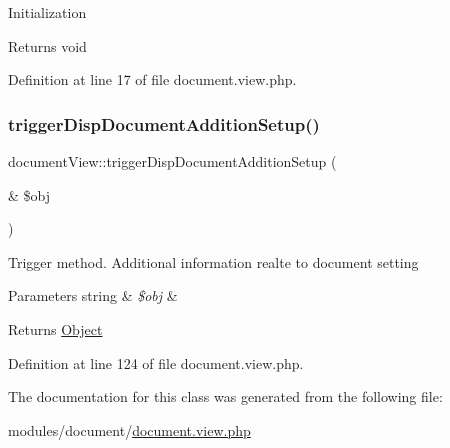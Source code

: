 Initialization \begin{DoxyReturn}{Returns}
void 
\end{DoxyReturn}


Definition at line 17 of file document.\+view.\+php.

\mbox{\label{classdocumentView_a0ea8992b5f032e29e528cbb9ab1b709c}} 
\subsubsection{\texorpdfstring{trigger\+Disp\+Document\+Addition\+Setup()}{triggerDispDocumentAdditionSetup()}}
{\footnotesize\ttfamily document\+View\+::trigger\+Disp\+Document\+Addition\+Setup (\begin{DoxyParamCaption}\item[{\&}]{\$obj }\end{DoxyParamCaption})}

Trigger method. Additional information realte to document setting 
\begin{DoxyParams}[1]{Parameters}
string & {\em \$obj} & \\
\hline
\end{DoxyParams}
\begin{DoxyReturn}{Returns}
\hyperlink{classObject}{Object} 
\end{DoxyReturn}


Definition at line 124 of file document.\+view.\+php.



The documentation for this class was generated from the following file\+:\begin{DoxyCompactItemize}
\item 
modules/document/\hyperlink{document_8view_8php}{document.\+view.\+php}\end{DoxyCompactItemize}

